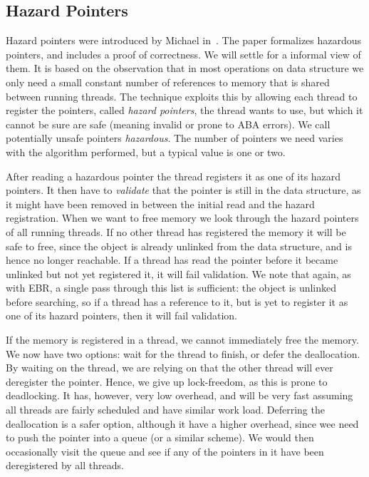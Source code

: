 \subsection{Hazard Pointers\label{sec:background-hazard}}

Hazard pointers were introduced by Michael in~\cite{michael2004hazard}.  The paper formalizes
hazardous pointers, and includes a proof of correctness. We will settle for a informal view of
them. It is based on the observation that in most operations on data structure we only need a small
constant number of references to memory that is shared between running threads. The technique
exploits this by allowing each thread to register the pointers, called \emph{hazard pointers}, the
thread wants to use, but which it cannot be sure are safe (meaning invalid or prone to ABA errors).
We call potentially unsafe pointers \emph{hazardous}. The number of pointers we need varies with
the algorithm performed, but a typical value is one or two.

After reading a hazardous pointer the thread registers it as one of its hazard pointers. It then
have to \emph{validate} that the pointer is still in the data structure, as it might have been
removed in between the initial read and the hazard registration. When we want to free memory we
look through the hazard pointers of all running threads. If no other thread has registered the
memory it will be safe to free, since the object is already unlinked from the data structure, and
is hence no longer reachable. If a thread has read the pointer before it became unlinked but not
yet registered it, it will fail validation.  We note that again, as with EBR, a single pass through
this list is sufficient: the object is unlinked before searching, so if a thread has a reference to
it, but is yet to register it as one of its hazard pointers, then it will fail validation.

If the memory is registered in a thread, we cannot immediately free the memory.  We now have two
options: wait for the thread to finish, or defer the deallocation.  By waiting on the thread, we
are relying on that the other thread will ever deregister the pointer. Hence, we give up
lock-freedom, as this is prone to deadlocking. It has, however, very low overhead, and will be very
fast assuming all threads are fairly scheduled and have similar work load.  Deferring the
deallocation is a safer option, although it have a higher overhead, since wee need to push the
pointer into a queue (or a similar scheme). We would then occasionally visit the queue and see if
any of the pointers in it have been deregistered by all threads.


